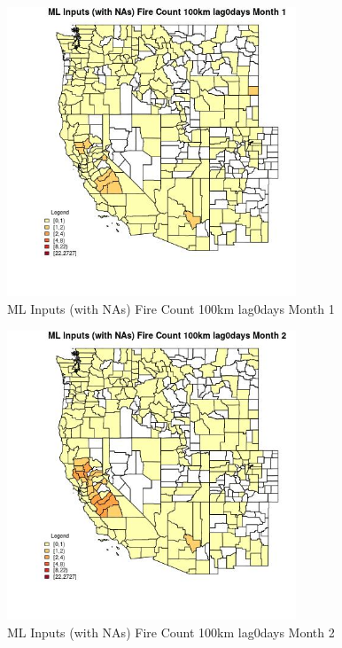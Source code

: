 \begin{figure} 
\centering  
\includegraphics[width=0.77\textwidth]{Code_Outputs/Report_ML_input_PM25_Step4_part_f_de_duplicated_aves_prioritize_24hr_obswNAs_CountyFire_Count_100km_lag0daysmedianMonth1.jpg} 
\caption{\label{fig:Report_ML_input_PM25_Step4_part_f_de_duplicated_aves_prioritize_24hr_obswNAsCountyFire_Count_100km_lag0daysmedianMonth1}ML Inputs (with NAs) Fire Count 100km lag0days Month 1} 
\end{figure} 
 

\begin{figure} 
\centering  
\includegraphics[width=0.77\textwidth]{Code_Outputs/Report_ML_input_PM25_Step4_part_f_de_duplicated_aves_prioritize_24hr_obswNAs_CountyFire_Count_100km_lag0daysmedianMonth2.jpg} 
\caption{\label{fig:Report_ML_input_PM25_Step4_part_f_de_duplicated_aves_prioritize_24hr_obswNAsCountyFire_Count_100km_lag0daysmedianMonth2}ML Inputs (with NAs) Fire Count 100km lag0days Month 2} 
\end{figure} 
 

